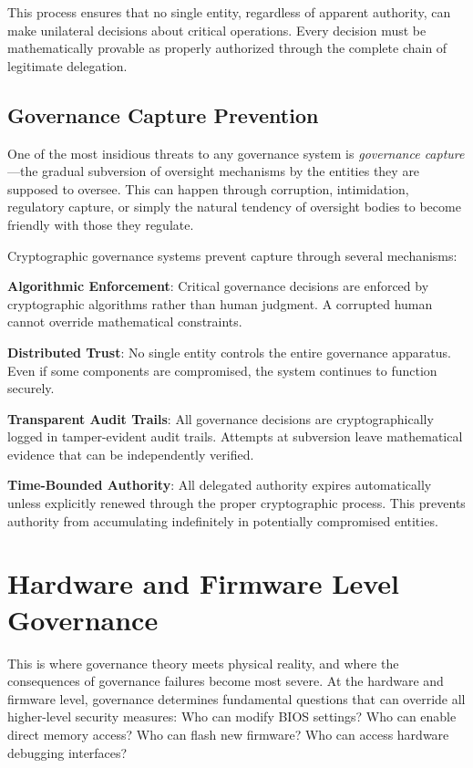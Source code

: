 This process ensures that no single entity, regardless of apparent authority, can make unilateral decisions about critical operations. Every decision must be mathematically provable as properly authorized through the complete chain of legitimate delegation.

\subsection{Governance Capture Prevention}

One of the most insidious threats to any governance system is \textit{governance capture}—the gradual subversion of oversight mechanisms by the entities they are supposed to oversee. This can happen through corruption, intimidation, regulatory capture, or simply the natural tendency of oversight bodies to become friendly with those they regulate.

Cryptographic governance systems prevent capture through several mechanisms:

\textbf{Algorithmic Enforcement}: Critical governance decisions are enforced by cryptographic algorithms rather than human judgment. A corrupted human cannot override mathematical constraints.

\textbf{Distributed Trust}: No single entity controls the entire governance apparatus. Even if some components are compromised, the system continues to function securely.

\textbf{Transparent Audit Trails}: All governance decisions are cryptographically logged in tamper-evident audit trails. Attempts at subversion leave mathematical evidence that can be independently verified.

\textbf{Time-Bounded Authority}: All delegated authority expires automatically unless explicitly renewed through the proper cryptographic process. This prevents authority from accumulating indefinitely in potentially compromised entities.

\section{Hardware and Firmware Level Governance}

This is where governance theory meets physical reality, and where the consequences of governance failures become most severe. At the hardware and firmware level, governance determines fundamental questions that can override all higher-level security measures: Who can modify BIOS settings? Who can enable direct memory access? Who can flash new firmware? Who can access hardware debugging interfaces?


